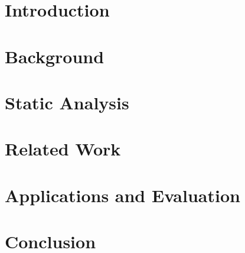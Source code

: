 \documentclass[12pt,a4paper]{report}
\begin{document}



\blankpage



\afterpage{\blankpage}



\afterpage{\blankpage}

\tableofcontents
\listoffigures

\clearpage


\chapter{Introduction}



\chapter{Background}



\chapter{Static Analysis}



\chapter{Related Work}



\chapter{Applications and Evaluation}



\chapter{Conclusion}



\printbibliography
\end{document}
